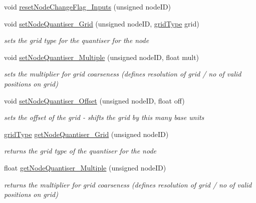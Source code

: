 \begin{DoxyCompactItemize}
\item 
void \mbox{\hyperlink{classMatsuokaEngine_a19fd8a9446e6bea6986d8de5c5c7bfd1}{reset\+Node\+Change\+Flag\+\_\+\+Inputs}} (unsigned node\+ID)
\item 
void \mbox{\hyperlink{classMatsuokaEngine_aeb46c52bb2a430616aea63732aba7e32}{set\+Node\+Quantiser\+\_\+\+Grid}} (unsigned node\+ID, \mbox{\hyperlink{classQuantisedEventQueue_ae186d50bd503038452edbbdd0c7c259e}{grid\+Type}} grid)
\begin{DoxyCompactList}\small\item\em sets the grid type for the quantiser for the node \end{DoxyCompactList}\item 
void \mbox{\hyperlink{classMatsuokaEngine_a1220a5a72f9bf35a9e6cd5a4f999f7e5}{set\+Node\+Quantiser\+\_\+\+Multiple}} (unsigned node\+ID, float mult)
\begin{DoxyCompactList}\small\item\em sets the multiplier for grid coarseness (defines resolution of grid / no of valid positions on grid) \end{DoxyCompactList}\item 
void \mbox{\hyperlink{classMatsuokaEngine_a12aafa189a6c9302937a00de6d291d42}{set\+Node\+Quantiser\+\_\+\+Offset}} (unsigned node\+ID, float off)
\begin{DoxyCompactList}\small\item\em sets the offset of the grid -\/ shifts the grid by this many base units \end{DoxyCompactList}\item 
\mbox{\hyperlink{classQuantisedEventQueue_ae186d50bd503038452edbbdd0c7c259e}{grid\+Type}} \mbox{\hyperlink{classMatsuokaEngine_adce59f3e8b45ab4c0ca804b17d8eb749}{get\+Node\+Quantiser\+\_\+\+Grid}} (unsigned node\+ID)
\begin{DoxyCompactList}\small\item\em returns the grid type of the quantiser for the node \end{DoxyCompactList}\item 
float \mbox{\hyperlink{classMatsuokaEngine_a1d0b1a452f3d9252d460177779b2d681}{get\+Node\+Quantiser\+\_\+\+Multiple}} (unsigned node\+ID)
\begin{DoxyCompactList}\small\item\em returns the multiplier for grid coarseness (defines resolution of grid / no of valid positions on grid) \end{DoxyCompactList}\item 

\end{DoxyCompactItemize}
